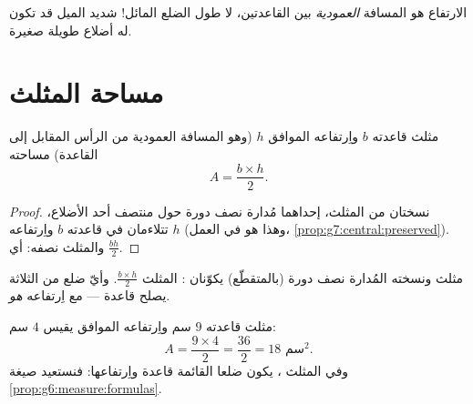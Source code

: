 \begin{remark}
الارتفاع هو المسافة \emph{العمودية} بين القاعدتين،
لا طول الضلع المائل!  شديد الميل قد
تكون له أضلاع طويلة  صغيرة.
\end{remark}

\section{مساحة المثلث}

\begin{theorem}[المثلث]\label{thm:g7:areas:triangle}
مثلث قاعدته $b$ واِرتفاعه الموافق $h$ (وهو
المسافة العمودية من الرأس المقابل إلى  القاعدة)
مساحته
\[
A = \frac{b \times h}{2} .
\]
\end{theorem}

\begin{proof}
نسختان من المثلث، إحداهما مُدارة نصف دورة حول
منتصف أحد الأضلاع، تتلاءمان في  قاعدته $b$
واِرتفاعه $h$ (وهذا هو  في العمل،
\cref{prop:g7:central:preserved}). والمثلث نصفه:
أي $\frac{bh}{2}$.
\end{proof}

\begin{omfigure}

{\small مثلث ونسخته المُدارة نصف دورة (بالمتقطّع) يكوّنان
:  المثلث $\frac{b\times h}{2}$. وأيّ ضلع من
الثلاثة يصلح قاعدة --- مع اِرتفاعه \emph{هو}.}
\end{omfigure}

\begin{example}\label{ex:g7:areas:triangle}
مثلث قاعدته $9$ سم واِرتفاعه الموافق يقيس
$4$ سم:
\[
A = \frac{9 \times 4}{2} = \frac{36}{2} = 18 \text{ سم}^2 .
\]
وفي المثلث \emph{}، يكون ضلعا القائمة قاعدة واِرتفاعها:
فنستعيد صيغة \cref{prop:g6:measure:formulas}.
\end{example}

